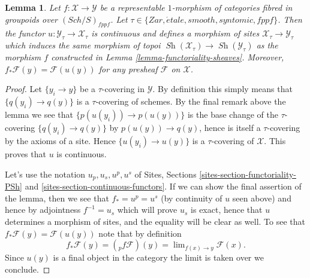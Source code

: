 \documentclass[10pt,a4paper]{amsart}
\theoremstyle{plain}
\newtheorem{lemma}[subsection]{Lemma}
\theoremstyle{definition}
\theoremstyle{remark}
\numberwithin{equation}{subsection}
\def\lim{\mathop{\mathrm{lim}}\nolimits}
\def\Sch{\mathit{Sch}}
\def\Sh{\mathop{\mathit{Sh}}\nolimits}
\def\etale{{\acute{e}tale}}
\begin{document}
\begin{lemma}
\label{lemma-representable-pushforward}
Let $f : \mathcal{X} \to \mathcal{Y}$ be a representable $1$-morphism of
categories fibred in groupoids over $(\Sch/S)_{fppf}$. Let
$\tau \in \{Zar, \etale, smooth, syntomic, fppf\}$.
Then the functor $u : \mathcal{Y}_\tau \to \mathcal{X}_\tau$ is continuous
and defines a morphism of sites $\mathcal{X}_\tau \to \mathcal{Y}_\tau$
which induces the same morphism of topoi
$\Sh(\mathcal{X}_\tau) \to \Sh(\mathcal{Y}_\tau)$
as the morphism $f$ constructed in
Lemma \ref{lemma-functoriality-sheaves}.
Moreover, $f_*\mathcal{F}(y) = \mathcal{F}(u(y))$ for any presheaf
$\mathcal{F}$ on $\mathcal{X}$.
\end{lemma}

\begin{proof}
Let $\{y_i \to y\}$ be a $\tau$-covering in $\mathcal{Y}$. By definition
this simply means that $\{q(y_i) \to q(y)\}$ is a $\tau$-covering of
schemes. By the final remark above the lemma we see that
$\{p(u(y_i)) \to p(u(y))\}$ is the base change of the $\tau$-covering
$\{q(y_i) \to q(y)\}$ by $p(u(y)) \to q(y)$, hence is itself a
$\tau$-covering by the axioms of a site. Hence $\{u(y_i) \to u(y)\}$
is a $\tau$-covering of $\mathcal{X}$. This proves that $u$ is
continuous.

\medskip\noindent
Let's use the notation $u_p, u_s, u^p, u^s$ of
Sites, Sections \ref{sites-section-functoriality-PSh} and
\ref{sites-section-continuous-functors}.
If we can show the final assertion of the lemma, then we see that
$f_* = u^p = u^s$ (by continuity of $u$ seen above) and hence by adjointness
$f^{-1} = u_s$ which will prove $u_s$ is exact, hence that $u$ determines
a morphism of sites, and the equality will be clear as well.
To see that $f_*\mathcal{F}(y) = \mathcal{F}(u(y))$ note that by
definition
$$
f_*\mathcal{F}(y) = ({}_pf\mathcal{F})(y) =
\lim_{f(x) \to y} \mathcal{F}(x).
$$
Since $u(y)$ is a final object in the category the limit is taken
over we conclude.
\end{proof}
\end{document}
